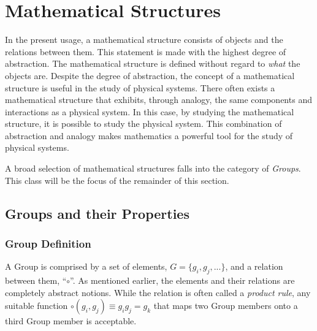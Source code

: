 \section{Mathematical Structures}

In the present usage, a mathematical structure consists of objects and the relations between them.
This statement is made with the highest degree of abstraction. The mathematical structure is defined without regard to \emph{what} the objects are.
Despite the degree of abstraction, the concept of a mathematical structure is useful in the study of physical systems.
There often exists a mathematical structure that exhibits, through analogy, the same components and interactions as a physical system.
In this case, by studying the mathematical structure, it is possible to study the physical system.
This combination of abstraction and analogy makes mathematics a powerful tool for the study of physical systems.

A broad selection of mathematical structures falls into the category of  \emph{Groups}.
This class will be the focus of the remainder of this section.

\subsection{Groups and their Properties}

\subsubsection{Group Definition}
A Group is comprised by a set of elements, $G=\{g_i,g_j,...\}$, and a relation between them, ``$\circ$''. 
As mentioned earlier, the elements and their relations are completely abstract notions.
While the relation is often called a \emph{product rule}, any suitable function $\circ(g_i,g_j)\equiv g_ig_j=g_k$ that maps two Group members onto a third Group member is acceptable.

